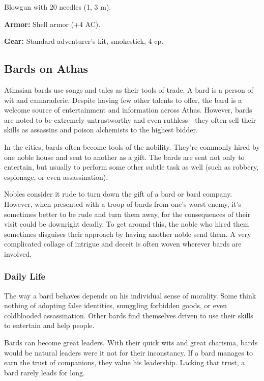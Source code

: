 Blowgun with 20 needles (1, 3 m).

\textbf{Armor:} Shell armor (+4 AC).

\textbf{Gear:} Standard adventurer's kit, smokestick, 4 cp.


\subsection{Bards on Athas}

Athasian bards use songs and tales as their tools of trade. A bard is a person of wit and camaraderie. Despite having few other talents to offer, the bard is a welcome source of entertainment and information across Athas. However, bards are noted to be extremely untrustworthy and even ruthless---they often sell their skills as assassins and poison alchemists to the highest bidder.

In the cities, bards often become tools of the nobility. They're commonly hired by one noble house and sent to another as a gift. The bards are sent not only to entertain, but usually to perform some other subtle task as well (such as robbery, espionage, or even assassination).

Nobles consider it rude to turn down the gift of a bard or bard company. However, when presented with a troop of bards from one's worst enemy, it's sometimes better to be rude and turn them away, for the consequences of their visit could be downright deadly. To get around this, the noble who hired them sometimes disguises their approach by having another noble send them. A very complicated collage of intrigue and deceit is often woven wherever bards are involved.

\subsubsection{Daily Life}
The way a bard behaves depends on his individual sense of morality. Some think nothing of adopting false identities, smuggling forbidden goods, or even coldblooded assassination. Other bards find themselves driven to use their skills to entertain and help people.

Bards can become great leaders. With their quick wits and great charisma, bards would be natural leaders were it not for their inconstancy. If a bard manages to earn the trust of companions, they value his leadership. Lacking that trust, a bard rarely leads for long.

